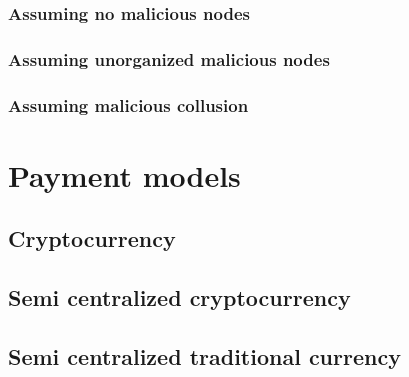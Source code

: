 \documentclass[11pt]{article}
\begin{document}
	    \subsubsection{Assuming no malicious nodes}
	    
	    \subsubsection{Assuming unorganized malicious nodes}
	    
	    \subsubsection{Assuming malicious collusion}
	    	    

\section{Payment models}

    \subsection{Cryptocurrency}
    
    \subsection{Semi centralized cryptocurrency}
    
    \subsection{Semi centralized traditional currency}
    
    
\medskip
 


\end{document}
